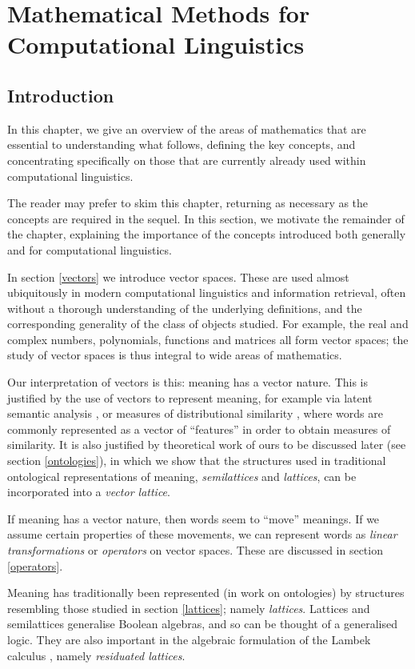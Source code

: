 \documentclass[12pt]{report}
\begin{document}
 

 \chapter{Mathematical Methods for Computational Linguistics}
 \section{Introduction}
 
In this chapter, we give an overview of the areas of mathematics that are essential to understanding what follows, defining the key concepts, and concentrating specifically on those that are currently already used within computational linguistics.
 
The reader may prefer to skim this chapter, returning as necessary as the concepts are required in the sequel. In this section, we motivate the remainder of the chapter, explaining the importance of the concepts introduced both generally and for computational linguistics.

In section \ref{vectors} we introduce vector spaces. These are used almost ubiquitously in modern computational linguistics and information retrieval, often without a thorough understanding of the underlying definitions, and the corresponding generality of the class of objects studied. For example, the real and complex numbers, polynomials, functions and matrices all form vector spaces; the study of vector spaces is thus integral to wide areas of mathematics.

Our interpretation of vectors is this: meaning has a vector nature. This is justified by the use of vectors to represent meaning, for example via latent semantic analysis \cite{Deerwester:90}, or measures of distributional similarity \cite{Lee}, where words are commonly represented as a vector of ``features'' in order to obtain measures of similarity. It is also justified by theoretical work of ours to be discussed later (see section \ref{ontologies}), in which we show that the structures used in traditional ontological representations of meaning, \emph{semilattices} and \emph{lattices}, can be incorporated into a \emph{vector lattice}.

If meaning has a vector nature, then words seem to ``move'' meanings. If we assume certain properties of these movements, we can represent words as \emph{linear transformations} or \emph{operators} on vector spaces. These are discussed in section \ref{operators}.

Meaning has traditionally been represented (in work on ontologies) by structures resembling those studied in section \ref{lattices}; namely \emph{lattices}. Lattices and semilattices generalise Boolean algebras, and so can be thought of a generalised logic. They are also important in the algebraic formulation of the Lambek calculus \cite{Lambek}, namely \emph{residuated lattices}.
\end{document}

